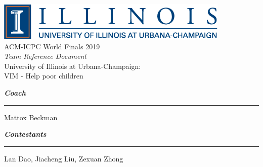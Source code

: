 \documentclass[10pt]{article}
\begin{document}
\thispagestyle{empty}
\begin{center}
    \includegraphics[scale=0.7]{logo.png} \\
    \vspace{15mm}
    {\Huge ACM-ICPC World Finals 2019}\\
    \vspace{10mm}
    {\LARGE \textit{Team Reference Document}} \\
    \vspace{10mm}
    {\LARGE University of Illinois at Urbana-Champaign:} \\
    \vspace{5mm}
    {\LARGE  VIM - Help poor children} \\
    \vspace{30mm}
\end{center}

    {\Large \textbf{\textit{Coach}}}
    \vspace{5mm}
    \hrule
    \vspace{5mm}
    {\Large Mattox Beckman } \\
    \vspace{10mm}


    {\Large \textbf{\textit{Contestants}}}
    \vspace{5mm}
    \hrule
    \vspace{5mm}
    {\Large Lan Dao, Jiacheng Liu, Zexuan Zhong }
\end{document}
